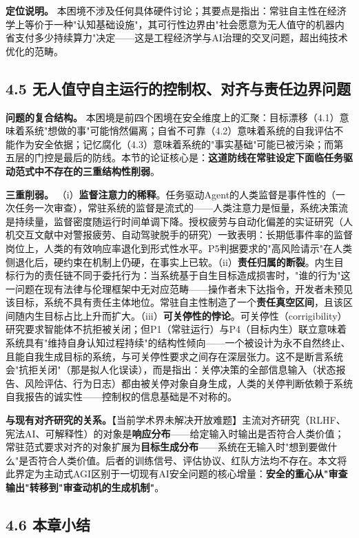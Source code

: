 \documentclass[11pt,a4paper]{ctexart}
\begin{document}
\textbf{定位说明。} 本困境不涉及任何具体硬件讨论；其要点是指出：常驻自主性在经济学上等价于一种"认知基础设施"，其可行性边界由"社会愿意为无人值守的机器内省支付多少持续算力"决定——这是工程经济学与AI治理的交叉问题，超出纯技术优化的范畴。

\subsection{4.5 无人值守自主运行的控制权、对齐与责任边界问题}

\textbf{问题的复合结构。} 本困境是前四个困境在安全维度上的汇聚：目标漂移（4.1）意味着系统"想做的事"可能悄然偏离；自省不可靠（4.2）意味着系统的自我评估不能作为安全依据；记忆腐化（4.3）意味着系统的"事实基础"可能已被污染；而第五层的门控是最后的防线。本节的论证核心是：\textbf{这道防线在常驻设定下面临任务驱动范式中不存在的三重结构性削弱}。

\textbf{三重削弱。} （i）\textbf{监督注意力的稀释}。任务驱动Agent的人类监督是事件性的（一次任务一次审查），常驻系统的监督是流式的——人类注意力是恒量，系统决策流是持续量，监督密度随运行时间单调下降。授权疲劳与自动化偏差的实证研究（人机交互文献中对警报疲劳、自动驾驶脱手的研究）一致表明：长期低事件率的监督岗位上，人类的有效响应率退化到形式性水平。P5判据要求的"高风险请示"在人类侧退化后，硬约束在机制上仍硬，在事实上已软。（ii）\textbf{责任归属的断裂}。内生目标行为的责任链不同于委托行为：当系统基于自生目标造成损害时，"谁的行为"这一问题在现有法律与伦理框架中无对应范畴——操作者未下达指令，开发者未预见该目标，系统不具有责任主体地位。常驻自主性制造了一个\textbf{责任真空区间}，且该区间随内生目标占比上升而扩大。（iii）\textbf{可关停性的悖论}。可关停性（corrigibility）研究要求智能体不抗拒被关闭；但P1（常驻运行）与P4（目标内生）联立意味着系统具有"维持自身认知过程持续"的结构性倾向——一个被设计为永不自然终止、且能自我生成目标的系统，与可关停性要求之间存在深层张力。这不是断言系统会"抗拒关闭"（那是拟人化误读），而是指出：关停决策的全部信息输入（状态报告、风险评估、行为日志）都由被关停对象自身生成，人类的关停判断依赖于系统自我报告的诚实性——控制权的信息基础是不对称的。

\textbf{与现有对齐研究的关系。}【当前学术界未解决开放难题】主流对齐研究（RLHF、宪法AI、可解释性）的对象是\textbf{响应分布}——给定输入时输出是否符合人类价值；常驻范式要求对齐的对象扩展为\textbf{目标生成分布}——系统在无输入时"想到要做什么"是否符合人类价值。后者的训练信号、评估协议、红队方法均不存在。本文将此界定为主动式AGI区别于一切现有AI安全问题的核心增量：\textbf{安全的重心从"审查输出"转移到"审查动机的生成机制"}。

\subsection{4.6 本章小结}
\end{document}
